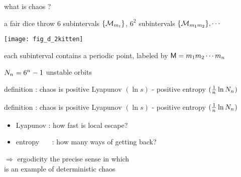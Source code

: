 \begin{frame}{what is chaos ?}
    \begin{block}{a fair dice throw}
$6$ subintervals $\{{\cal M}_{{m_{t}}}\}$,
$6^2$ subintervals $\{{\cal M}_{{m_{1}}{m_{2}}}\}, \cdots$
\begin{center}
            \begin{minipage}[c]{0.32\textwidth}\begin{center}
\texttt{[image: fig\_d\_2kitten]} %
            \end{center}\end{minipage}
            \hspace{2ex}
            \begin{minipage}[c]{0.46\textwidth}
each subinterval contains a periodic point,
labeled by
$\mathsf{M}={m_{1}}{m_{2}}\cdots{\ensuremath{m_{{n_{}}}}}$
\bigskip

$N_{n_{}} = 6^{n_{}}-1$ {\color{red}unstable} orbits
            \end{minipage}
\end{center}
    \end{block}
\vfill
    \begin{block}{definition : chaos is}
positive Lyapunov $(\ln s)$ - positive entropy $(\frac{1}{{n_{}}}\ln N_{n_{}})$
    \end{block}
\end{frame} %

\begin{frame}{}
    \begin{block}{definition : chaos is}
positive {\color{blue}Lyapunov} $(\ln s)$
         -
positive {\color{blue}entropy} $(\frac{1}{{n_{}}}\ln N_{n_{}})$
    \end{block}
\bigskip
\begin{itemize}
  \item {\color{blue}Lyapunov} : how fast is local escape?
  \item {\color{blue}entropy} ~~~: how many ways of getting back?
\end{itemize}
                \hfill $\Rightarrow$ {\color{blue}ergodicity}
\vfill
the precise sense in which
\\
is an example of deterministic chaos
\end{frame} %

